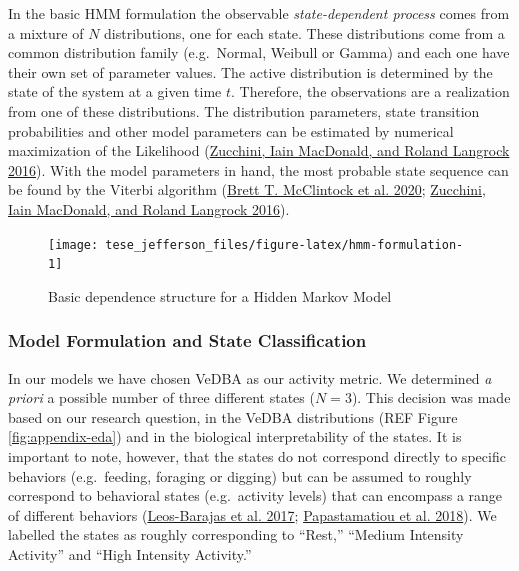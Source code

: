 \documentclass[english,msc,numbers,hidelinks]{coppe}
\begin{document}
  In the basic HMM formulation the observable \emph{state-dependent process} comes from a mixture of \(N\) distributions, one for each state. These distributions come from a common distribution family (e.g.~Normal, Weibull or Gamma) and each one have their own set of parameter values. The active distribution is determined by the state of the system at a given time \(t\). Therefore, the observations are a realization from one of these distributions. The distribution parameters, state transition probabilities and other model parameters can be estimated by numerical maximization of the Likelihood (\protect\hyperlink{ref-zucchini2016}{Zucchini, Iain MacDonald, and Roland Langrock 2016}). With the model parameters in hand, the most probable state sequence can be found by the Viterbi algorithm (\protect\hyperlink{ref-mcclintock2020}{Brett T. McClintock et al. 2020}; \protect\hyperlink{ref-zucchini2016}{Zucchini, Iain MacDonald, and Roland Langrock 2016}).
  \begin{figure}

  {\centering \texttt{[image: tese\_jefferson\_files/figure-latex/hmm-formulation-1]} 

  }

  \caption{Basic dependence structure for a Hidden Markov Model}\label{fig:hmm-formulation}
  \end{figure}
  \hypertarget{model-formulation-and-state-classification}{%
  \subsubsection{Model Formulation and State Classification}\label{model-formulation-and-state-classification}}

  In our models we have chosen VeDBA as our activity metric. We determined \emph{a priori} a possible number of three different states (\(N=3\)). This decision was made based on our research question, in the VeDBA distributions (REF Figure \ref{fig:appendix-eda}) and in the biological interpretability of the states. It is important to note, however, that the states do not correspond directly to specific behaviors (e.g.~feeding, foraging or digging) but can be assumed to roughly correspond to behavioral states (e.g.~activity levels) that can encompass a range of different behaviors (\protect\hyperlink{ref-leosbarajas2017}{Leos-Barajas et al. 2017}; \protect\hyperlink{ref-papastamatiou2018}{Papastamatiou et al. 2018}). We labelled the states as roughly corresponding to ``Rest,'' ``Medium Intensity Activity'' and ``High Intensity Activity.''
\end{document}
